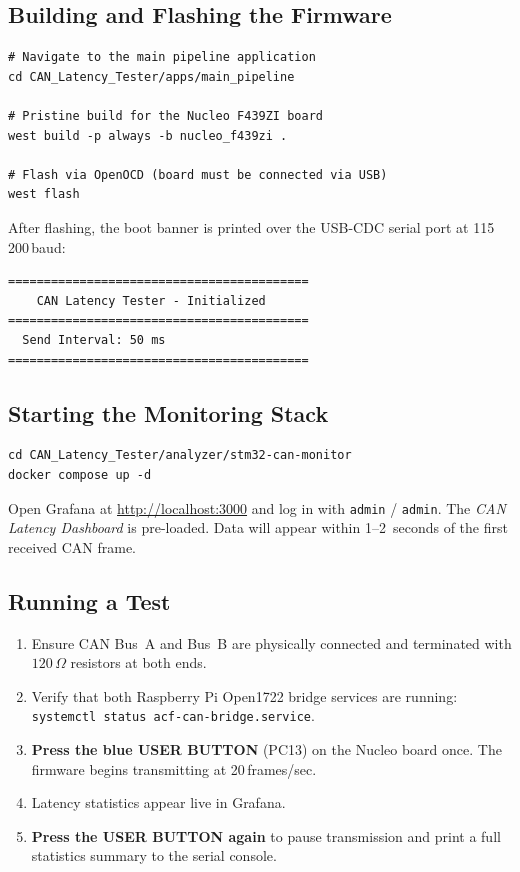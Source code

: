\documentclass[11pt,a4paper]{article}
\begin{document}
\subsection{Building and Flashing the Firmware}

\begin{lstlisting}[caption={Build and flash the measurement firmware}]
# Navigate to the main pipeline application
cd CAN_Latency_Tester/apps/main_pipeline

# Pristine build for the Nucleo F439ZI board
west build -p always -b nucleo_f439zi .

# Flash via OpenOCD (board must be connected via USB)
west flash
\end{lstlisting}

After flashing, the boot banner is printed over the USB-CDC serial port at 115\,200\,baud:

\begin{lstlisting}
==========================================
    CAN Latency Tester - Initialized
==========================================
  Send Interval: 50 ms
==========================================
\end{lstlisting}

\subsection{Starting the Monitoring Stack}

\begin{lstlisting}[caption={Launch the Docker monitoring stack}]
cd CAN_Latency_Tester/analyzer/stm32-can-monitor
docker compose up -d
\end{lstlisting}

Open Grafana at \url{http://localhost:3000} and log in with \texttt{admin} / \texttt{admin}.
The \emph{CAN Latency Dashboard} is pre-loaded.  Data will appear within 1--2~seconds of
the first received CAN frame.

\subsection{Running a Test}

\begin{enumerate}
    \item Ensure CAN Bus~A and Bus~B are physically connected and terminated with
          $120\,\Omega$ resistors at both ends.
    \item Verify that both Raspberry Pi Open1722 bridge services are running:
          \texttt{systemctl status acf-can-bridge.service}.
    \item \textbf{Press the blue USER BUTTON} (PC13) on the Nucleo board once.
          The firmware begins transmitting at 20\,frames/sec.
    \item Latency statistics appear live in Grafana.
    \item \textbf{Press the USER BUTTON again} to pause transmission and print a full
          statistics summary to the serial console.
\end{enumerate}
\end{document}
